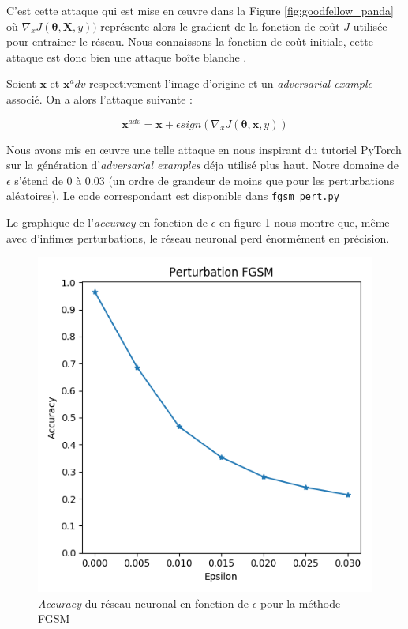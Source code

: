 \documentclass[10pt,twocolumn,letterpaper]{article}
\begin{document}
C'est cette attaque qui est mise en œuvre dans la Figure \ref{fig:goodfellow_panda} où $\nabla_x J(\bm{\theta}, \bm{X}, y))$ représente alors le gradient de la fonction de coût $J$ utilisée pour entrainer le réseau. Nous connaissons la fonction de coût initiale, cette attaque est donc bien une attaque \og boîte blanche \fg{}.

Soient $\bm{x}$ et $\bm{x}^adv$ respectivement l'image d'origine et un \textit{adversarial example} associé. On a alors l'attaque suivante :

\begin{equation}
\bm{x}^{adv} = \bm{x} + \epsilon sign(\nabla_x J(\bm{\theta}, \bm{x}, y))
\end{equation}

Nous avons mis en œuvre une telle attaque en nous inspirant du tutoriel PyTorch sur la génération d'\textit{adversarial examples} déja utilisé plus haut. Notre domaine de $\epsilon$ s'étend de 0 à 0.03 (un ordre de grandeur de moins que pour les perturbations aléatoires). Le code correspondant est disponible dans \texttt{fgsm\_pert.py}

Le graphique de l'\textit{accuracy} en fonction de $\epsilon$  en figure \ref{fig:fgsm_plot} nous montre que, même avec d'infimes perturbations, le réseau neuronal perd énormément en précision.

\begin{figure}[!h]
\begin{center}
\includegraphics[width=0.85\linewidth]{ressources/fgsm_plot.png}
\end{center}
   \caption{\textit{Accuracy} du réseau neuronal en fonction de $\epsilon$ pour la méthode FGSM}
\label{fig:fgsm_plot}
\end{figure}
\end{document}
